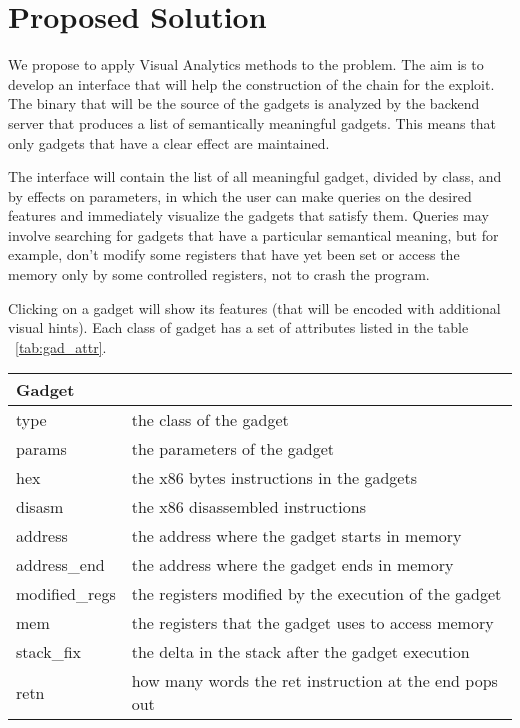 \documentclass[twocolumn, 11pt]{article}
\begin{document}
\section{Proposed Solution}

We propose to apply Visual Analytics methods to the problem. The aim is to develop an interface that will help the construction of the chain for the exploit.
The binary that will be the source of the gadgets is analyzed by the backend server that produces a list of semantically meaningful gadgets. This means that only gadgets that have a clear effect are maintained.

The interface will contain the list of all meaningful gadget, divided by class, and by effects on parameters, in which the user can make queries on the desired features and immediately visualize the gadgets that satisfy them.
Queries may involve searching for gadgets that have a particular semantical meaning, but for example, don't modify some registers that have yet been set or access the memory only by some controlled registers, not to crash the program.

Clicking on a gadget will show its features (that will be encoded with additional visual hints). Each class of gadget has a set of attributes listed in the table ~\ref{tab:gad_attr}.

\bigskip

\begin{table*}[ht]
\caption{Gadget attributes}\label{tab:gad_attr}
\centering
  \begin{tabular}{|l|l|}
    \hline
    \textbf{Gadget} & \\ \hline
    type & the class of the gadget \\ \hline
    params & the parameters of the gadget \\ \hline
    hex & the x86 bytes instructions in the gadgets \\ \hline
    disasm & the x86 disassembled instructions \\ \hline
    address & the address where the gadget starts in memory \\ \hline
    address\_end & the address where the gadget ends in memory \\ \hline
    modified\_regs & the registers modified by the execution of the gadget \\ \hline
    mem & the registers that the gadget uses to access memory \\ \hline
    stack\_fix & the delta in the stack after the gadget execution \\ \hline
    retn & how many words the ret instruction at the end pops out \\ \hline
  \end{tabular}
\end{table*}
\end{document}
